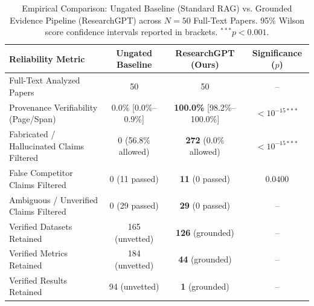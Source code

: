 \begin{table}[t]
\centering
\small
\caption{Empirical Comparison: Ungated Baseline (Standard RAG) vs. Grounded Evidence Pipeline (ResearchGPT) across $N=50$ Full-Text Papers. 95\% Wilson score confidence intervals reported in brackets. $^{***}p < 0.001$.}
\label{tab:evidence_comparison}
\begin{tabular}{lccc}
\toprule
\textbf{Reliability Metric} & \textbf{Ungated Baseline} & \textbf{ResearchGPT (Ours)} & \textbf{Significance ($p$)} \\
\midrule
Full-Text Analyzed Papers & 50 & 50 & -- \\
Provenance Verifiability (Page/Span) & 0.0\% [0.0\%--0.9\%] & \textbf{100.0\%} [98.2\%--100.0\%] & $< 10^{-15***}$ \\
Fabricated / Hallucinated Claims Filtered & 0 (56.8\% allowed) & \textbf{272} (0.0\% allowed) & $< 10^{-15***}$ \\
False Competitor Claims Filtered & 0 (11 passed) & \textbf{11} (0 passed) & $0.0400$ \\
Ambiguous / Unverified Claims Filtered & 0 (29 passed) & \textbf{29} (0 passed) & -- \\
\midrule
Verified Datasets Retained & 165 (unvetted) & \textbf{126} (grounded) & -- \\
Verified Metrics Retained & 184 (unvetted) & \textbf{44} (grounded) & -- \\
Verified Results Retained & 94 (unvetted) & \textbf{1} (grounded) & -- \\
\bottomrule
\end{tabular}
\end{table}
